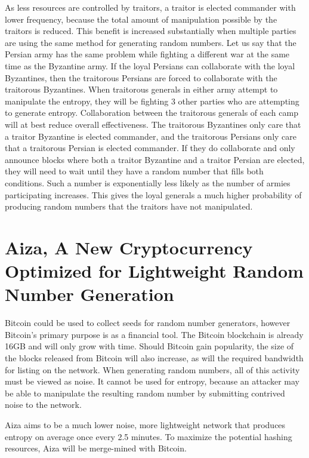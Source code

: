 \documentclass[twocolumn]{article}
\begin{document}
As less resources are controlled by traitors, a traitor is elected commander with lower frequency, because the total amount of manipulation possible by the traitors is reduced.
This benefit is increased substantially when multiple parties are using the same method for generating random numbers.
Let us say that the Persian army has the same problem while fighting a different war at the same time as the Byzantine army.
If the loyal Persians can collaborate with the loyal Byzantines, then the traitorous Persians are forced to collaborate with the traitorous Byzantines.
When traitorous generals in either army attempt to manipulate the entropy, they will be fighting 3 other parties who are attempting to generate entropy.
Collaboration between the traitorous generals of each camp will at best reduce overall effectiveness.
The traitorous Byzantines only care that a traitor Byzantine is elected commander, and the traitorous Persians only care that a traitorous Persian is elected commander.
If they do collaborate and only announce blocks where both a traitor Byzantine and a traitor Persian are elected, they will need to wait until they have a random number that fills both conditions.
Such a number is exponentially less likely as the number of armies participating increases.
This gives the loyal generals a much higher probability of producing random numbers that the traitors have not manipulated.

\section{Aiza, A New Cryptocurrency Optimized for Lightweight Random Number Generation}

Bitcoin could be used to collect seeds for random number generators, however Bitcoin's primary purpose is as a financial tool.
The Bitcoin blockchain is already 16GB and will only grow with time.
Should Bitcoin gain popularity, the size of the blocks released from Bitcoin will also increase, as will the required bandwidth for listing on the network.
When generating random numbers, all of this activity must be viewed as noise.
It cannot be used for entropy, because an attacker may be able to manipulate the resulting random number by submitting contrived noise to the network.

Aiza aims to be a much lower noise, more lightweight network that produces entropy on average once every 2.5 minutes.
To maximize the potential hashing resources, Aiza will be merge-mined with Bitcoin.
\end{document}
